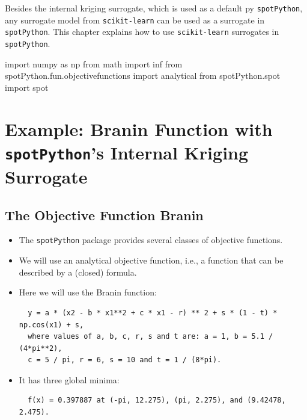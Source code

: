\documentclass[
  letterpaper,
  DIV=11,
  numbers=noendperiod]{scrreprt}
\newenvironment{Shaded}{\begin{snugshade}}{\end{snugshade}}
\newcommand{\ImportTok}[1]{\textcolor[rgb]{0.00,0.46,0.62}{#1}}
\newcommand{\NormalTok}[1]{\textcolor[rgb]{0.00,0.23,0.31}{#1}}
\begin{document}
Besides the internal kriging surrogate, which is used as a default py
\texttt{spotPython}, any surrogate model from \texttt{scikit-learn} can
be used as a surrogate in \texttt{spotPython}. This chapter explains how
to use \texttt{scikit-learn} surrogates in \texttt{spotPython}.

\begin{Shaded}
\begin{Highlighting}[]
\ImportTok{import}\NormalTok{ numpy }\ImportTok{as}\NormalTok{ np}
\ImportTok{from}\NormalTok{ math }\ImportTok{import}\NormalTok{ inf}
\ImportTok{from}\NormalTok{ spotPython.fun.objectivefunctions }\ImportTok{import}\NormalTok{ analytical}
\ImportTok{from}\NormalTok{ spotPython.spot }\ImportTok{import}\NormalTok{ spot}
\end{Highlighting}
\end{Shaded}

\hypertarget{example-branin-function-with-spotpythons-internal-kriging-surrogate}{%
\section{\texorpdfstring{Example: Branin Function with
\texttt{spotPython}'s Internal Kriging
Surrogate}{Example: Branin Function with spotPython's Internal Kriging Surrogate}}\label{example-branin-function-with-spotpythons-internal-kriging-surrogate}}

\hypertarget{the-objective-function-branin}{%
\subsection{The Objective Function
Branin}\label{the-objective-function-branin}}

\begin{itemize}
\item
  The \texttt{spotPython} package provides several classes of objective
  functions.
\item
  We will use an analytical objective function, i.e., a function that
  can be described by a (closed) formula.
\item
  Here we will use the Branin function:

\begin{verbatim}
  y = a * (x2 - b * x1**2 + c * x1 - r) ** 2 + s * (1 - t) * np.cos(x1) + s,
  where values of a, b, c, r, s and t are: a = 1, b = 5.1 / (4*pi**2),
  c = 5 / pi, r = 6, s = 10 and t = 1 / (8*pi).
\end{verbatim}
\item
  It has three global minima:

\begin{verbatim}
  f(x) = 0.397887 at (-pi, 12.275), (pi, 2.275), and (9.42478, 2.475).
\end{verbatim}
\end{itemize}
\end{document}
